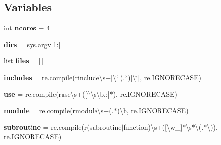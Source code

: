 \subsection*{Variables}
\begin{DoxyCompactItemize}
\item 
\mbox{\label{namespacemain_a21bfb290c2938894b2f3bf5dc01eb49d}} 
int {\bfseries ncores} = 4
\item 
\mbox{\label{namespacemain_aacecf8034c3446f4b93a5aa31f616e4a}} 
{\bfseries dirs} = sys.\+argv\mbox{[}1\+:\mbox{]}
\item 
\mbox{\label{namespacemain_a9707e2ca85a5f1bceadafcd3b49aee12}} 
list {\bfseries files} = \mbox{[}$\,$\mbox{]}
\item 
\mbox{\label{namespacemain_a8332d1261ee0382aace00edb978eb5bb}} 
{\bfseries includes} = re.\+compile(r\textquotesingle{}include\textbackslash{}s+\mbox{[}\textbackslash{}\textquotesingle{}\char`\"{}\mbox{]}(.$\ast$)\mbox{[}\textbackslash{}\textquotesingle{}\char`\"{}\mbox{]}\textquotesingle{}, re.\+I\+G\+N\+O\+R\+E\+C\+A\+SE)
\item 
\mbox{\label{namespacemain_a461ca3dee9162fdae53af242c121c352}} 
{\bfseries use} = re.\+compile(r\textquotesingle{}use\textbackslash{}s+(\mbox{[}$^\wedge$\textbackslash{}s\textbackslash{}b,\+:\mbox{]}$\ast$)\textquotesingle{}, re.\+I\+G\+N\+O\+R\+E\+C\+A\+SE)
\item 
\mbox{\label{namespacemain_a71ce69de127f79fc075b3e0e7dc33779}} 
{\bfseries module} = re.\+compile(r\textquotesingle{}module\textbackslash{}s+(.$\ast$)\textbackslash{}b\textquotesingle{}, re.\+I\+G\+N\+O\+R\+E\+C\+A\+SE)
\item 
\mbox{\label{namespacemain_adee976540258861284f9692d071dbf34}} 
{\bfseries subroutine} = re.\+compile(r\textquotesingle{}(subroutine$\vert$function)\textbackslash{}s+(\mbox{[}\textbackslash{}w\+\_\+\mbox{]}$\ast$\textbackslash{}s$\ast$\textbackslash{}(.$\ast$\textbackslash{}))\textquotesingle{}, re.\+I\+G\+N\+O\+R\+E\+C\+A\+SE)
\item 
\mbox{\label{namespacemain_a6026ef516de9d45644ba57ee20f74526}} 

\end{DoxyCompactItemize}
